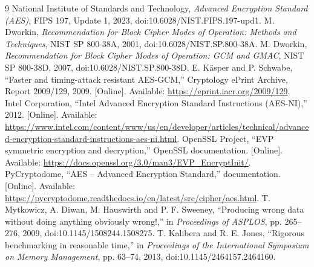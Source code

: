 \begin{thebibliography}{9}\small
{} National Institute of Standards and Technology, \emph{Advanced Encryption Standard (AES)}, FIPS 197, Update 1, 2023, doi:10.6028/NIST.FIPS.197-upd1.
 M. Dworkin, \emph{Recommendation for Block Cipher Modes of Operation: Methods and Techniques}, NIST SP 800-38A, 2001, doi:10.6028/NIST.SP.800-38A.
 M. Dworkin, \emph{Recommendation for Block Cipher Modes of Operation: GCM and GMAC}, NIST SP 800-38D, 2007, doi:10.6028/NIST.SP.800-38D.
 E. K\"asper and P. Schwabe, ``Faster and timing-attack resistant AES-GCM,'' Cryptology ePrint Archive, Report 2009/129, 2009. [Online]. Available: \url{https://eprint.iacr.org/2009/129}.
 Intel Corporation, ``Intel Advanced Encryption Standard Instructions (AES-NI),'' 2012. [Online]. Available: \url{https://www.intel.com/content/www/us/en/developer/articles/technical/advanced-encryption-standard-instructions-aes-ni.html}.
 OpenSSL Project, ``EVP symmetric encryption and decryption,'' OpenSSL documentation. [Online]. Available: \url{https://docs.openssl.org/3.0/man3/EVP_EncryptInit/}.
 PyCryptodome, ``AES -- Advanced Encryption Standard,'' documentation. [Online]. Available: \url{https://pycryptodome.readthedocs.io/en/latest/src/cipher/aes.html}.
 T. Mytkowicz, A. Diwan, M. Hauswirth and P. F. Sweeney, ``Producing wrong data without doing anything obviously wrong!,'' in \emph{Proceedings of ASPLOS}, pp. 265--276, 2009, doi:10.1145/1508244.1508275.
 T. Kalibera and R. E. Jones, ``Rigorous benchmarking in reasonable time,'' in \emph{Proceedings of the International Symposium on Memory Management}, pp. 63--74, 2013, doi:10.1145/2464157.2464160.
\end{thebibliography}
